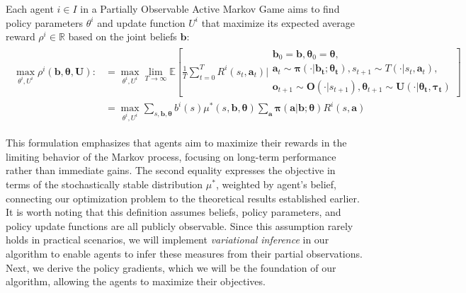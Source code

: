 \begin{definition}
    Each agent $i \in I$ in a Partially Observable Active Markov Game aims to find policy parameters $\theta^i$ and update function $U^i$ that maximize its expected average reward $\rho^i \in \mathbb{R}$ based on the joint beliefs $\boldsymbol{b}$:
    \begin{align}
        \begin{split}
            \max_{\theta^i, U^i} \rho^i(\boldsymbol{b}, \boldsymbol{\theta}, \boldsymbol{U}) : & = \max_{\theta^i, U^i} \lim_{T \to \infty} \mathbb{E}\left[\frac{1}{T}\sum_{t=0}^T R^i(s_t, \boldsymbol{a}_t) \Bigg|
                \begin{array}{c}
                    \boldsymbol{b}_0= \boldsymbol{b}, \boldsymbol{\theta}_0= \boldsymbol{\theta}, \\
                    \boldsymbol{a}_t \sim \boldsymbol{\pi}(\cdot|\boldsymbol{b_t}; \boldsymbol{\theta_t}),
                    s_{t+1} \sim T(\cdot|s_t, \boldsymbol{a}_t),        \\
                    \boldsymbol{o}_{t+1} \sim \boldsymbol{O}(\cdot|s_{t+1}),
                    \boldsymbol{\theta}_{t+1} \sim \boldsymbol{U}(\cdot|\boldsymbol{\theta_t}, \boldsymbol{\tau_t})
                \end{array}
            \right]                                                                                                                                                                                                                                                                                                                          \\
                                                                                               & = \max_{\theta^i, U^i} \sum_{s, \boldsymbol{b}, \boldsymbol{\theta}} b^i(s) \mu^*(s, \boldsymbol{b}, \boldsymbol{\theta}) \sum_{\boldsymbol{a}} \boldsymbol{\pi}(\boldsymbol{a}|\boldsymbol{b}; \boldsymbol{\theta}) R^i(s, \boldsymbol{a})
        \end{split}
    \end{align}


\end{definition}

This formulation emphasizes that agents aim to maximize their rewards in the limiting behavior of the Markov process, focusing on long-term performance rather than immediate gains. The second equality expresses the objective in terms of the stochastically stable distribution $\mu^*$, weighted by agent's belief, connecting our optimization problem to the theoretical results established earlier. It is worth noting that this definition assumes beliefs, policy parameters, and policy update functions are all publicly observable. Since this assumption rarely holds in practical scenarios, we will implement \textit{variational inference} in our algorithm to enable agents to infer these measures from their partial observations. Next, we derive the policy gradients, which we will be the foundation of our algorithm, allowing the agents to maximize their objectives.

